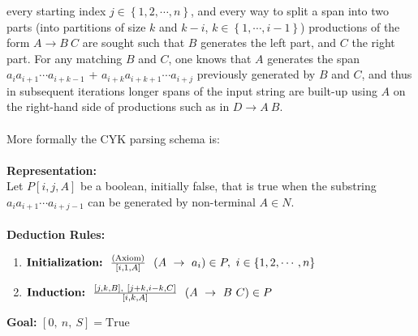 \documentclass[11pt]{article}
\begin{document}
every starting index $j \in \left\{1,2,\cdots,n\right\}$, and every way to split a span into two parts
(into partitions of size $k$ and $k - i$, $k \in \left\{1, \cdots, i - 1\right\}$) productions of the form
$A \rightarrow B \ C$ are sought such that $B$ generates the left part, and $C$ the right part.
For any matching $B$ and $C$, one knows that $A$ generates the span $a_i a_{i+1} \cdots a_{i+k-1}$ + $a_{i+k} a_{i+k+1} \cdots a_{i+j}$ previously generated by $B$ and $C$, and
thus in subsequent iterations longer spans of the input string are built-up using $A$ on the right-hand side of
productions such as in $D \rightarrow A \ B$. \\ \\
More formally the CYK parsing schema is:\\ \\
{\bf Representation:}\\
Let $P[i, j, A]$ be a boolean, initially false, that is true when the substring
$a_i a_{i+1} \cdots a_{i+j-1}$ can be generated by non-terminal $A \in N$.\\ \\
{\bf Deduction Rules:}
\begin{enumerate}
\item $\text{{\bf Initialization:}} \ \ \frac{\text{(Axiom)}}{\left[i, 1, A\right]} \ \ {(A \ \rightarrow \ a_i) \in P, \ i \in \left\{ 1, 2, \cdots, n \right\}}$ \\
\item $\text{{\bf Induction:}} \ \ \frac{[j, k, B], \ [j+k, i - k, C]}{[i, k, A]} \ \ {(A \ \rightarrow \ B \ C) \in P}$ 
\end{enumerate}
{\bf Goal:}
$[0, \ n, \ S] = \text{True}$
\end{document}
